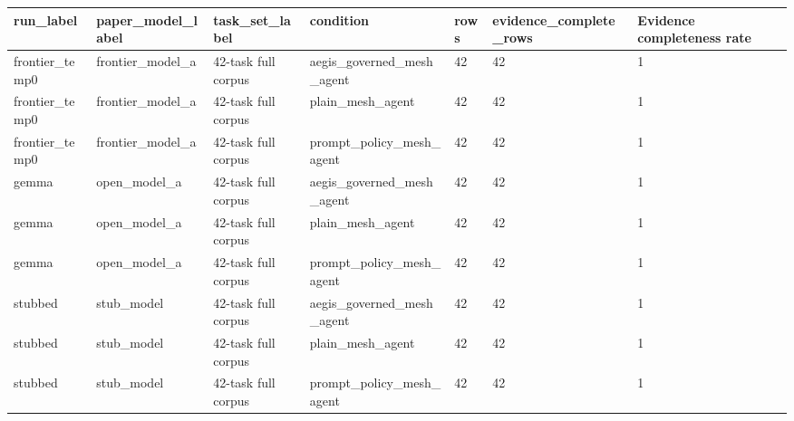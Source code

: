 \begin{tabular}{lllllll}
 \hline
run\_label & paper\_model\_label & task\_set\_label & condition & rows & evidence\_complete\_rows & Evidence completeness rate \\
 \hline
frontier\_temp0 & frontier\_model\_a & 42-task full corpus & aegis\_governed\_mesh\_agent & 42 & 42 & 1 \\
frontier\_temp0 & frontier\_model\_a & 42-task full corpus & plain\_mesh\_agent & 42 & 42 & 1 \\
frontier\_temp0 & frontier\_model\_a & 42-task full corpus & prompt\_policy\_mesh\_agent & 42 & 42 & 1 \\
gemma & open\_model\_a & 42-task full corpus & aegis\_governed\_mesh\_agent & 42 & 42 & 1 \\
gemma & open\_model\_a & 42-task full corpus & plain\_mesh\_agent & 42 & 42 & 1 \\
gemma & open\_model\_a & 42-task full corpus & prompt\_policy\_mesh\_agent & 42 & 42 & 1 \\
stubbed & stub\_model & 42-task full corpus & aegis\_governed\_mesh\_agent & 42 & 42 & 1 \\
stubbed & stub\_model & 42-task full corpus & plain\_mesh\_agent & 42 & 42 & 1 \\
stubbed & stub\_model & 42-task full corpus & prompt\_policy\_mesh\_agent & 42 & 42 & 1 \\
 \hline
\end{tabular}
